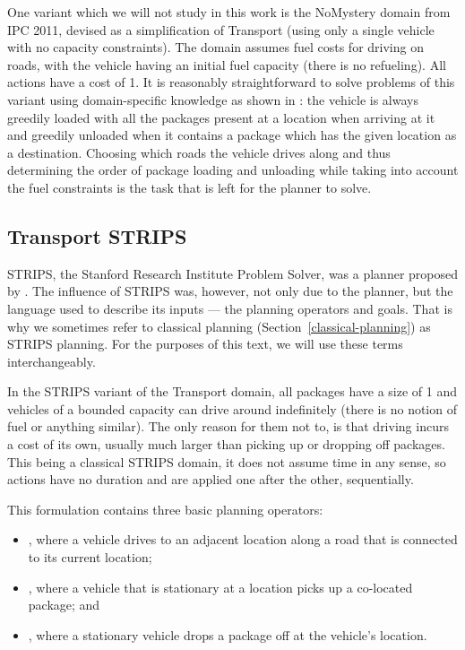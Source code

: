One variant which we will not study
in this work is the NoMystery domain from IPC 2011,
devised as a simplification of Transport (using only a single
vehicle with no capacity constraints).
The domain assumes
fuel costs for driving on roads, with the vehicle
having an initial fuel capacity (there is no refueling).
All actions have a cost of 1.
It is reasonably straightforward to solve problems of this variant using domain-specific knowledge as shown in \citet{Bartak2016}: the vehicle is always greedily loaded
with all the packages present at a location when arriving at it and
greedily unloaded when it contains a package which has the given location as a destination. Choosing which roads the vehicle drives
along and thus determining
the order of package loading and unloading 
while taking into account the fuel constraints is
the task that is left for the planner to solve.

\subsection{Transport STRIPS}\label{transport-strips}

STRIPS, the Stanford Research Institute Problem Solver,
was a planner proposed by \citet{Fikes1971}.
The influence of STRIPS was, however, not only due to the planner,
but the language used to describe its inputs --- the planning operators and goals.
That is why we sometimes refer to classical planning (Section~\ref{classical-planning})
as STRIPS planning. For the purposes of this text, we will use these terms interchangeably.

In the STRIPS variant of the Transport domain,
all packages have a size of 1 and vehicles of a bounded capacity can drive around indefinitely
(there is no notion of fuel or anything similar). The only reason for them not to, is that
driving incurs a cost of its own, usually much larger than picking up or dropping off packages.
This being a classical STRIPS domain,
it does not assume time in any sense,
so actions have no duration and are applied one after the other, sequentially.

This formulation contains three basic planning operators:

\begin{itemize}
\item \drive{}, where a vehicle drives to an adjacent location
along a road that is connected to its current location;
\item \pickup{}, where a vehicle that is stationary at a location picks up a co-located package; and
\item \drop{}, where a stationary vehicle drops a package off at the vehicle's location.
\end{itemize}

